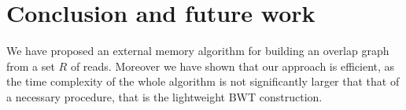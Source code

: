\documentclass[runningheads,envcountsame,a4paper]{llncs}
\begin{document}
\section{Conclusion and future work}
%

We have  proposed an external memory algorithm for building an overlap  graph from a set $R$ of reads.
Moreover we have shown that our approach is efficient, as the time complexity of
the whole algorithm is not significantly larger that that of a necessary
procedure, that is the lightweight BWT construction.
\end{document}
